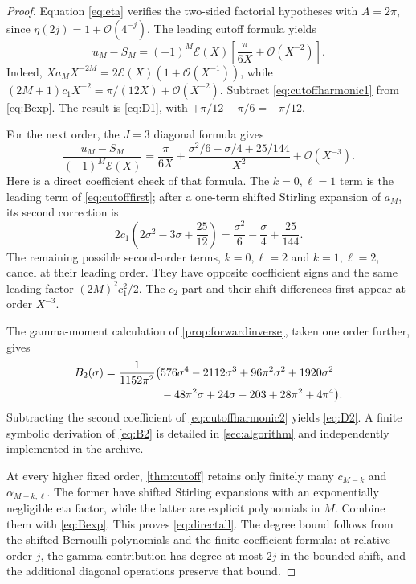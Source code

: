 \documentclass[11pt,a4paper]{article}
\theoremstyle{definition}
\numberwithin{equation}{section}
\newcommand{\Oh}{\mathcal O}
\newcommand{\scal}{\mathcal E}
\begin{document}
\begin{proof}
Equation \eqref{eq:eta} verifies the two-sided factorial hypotheses with $A=2\pi$, since $\eta(2j)=1+\Oh(4^{-j})$. The leading cutoff formula yields
\begin{equation}
 u_M-S_M=(-1)^M\scal(X)
       \left[\frac\pi{6X}+\Oh(X^{-2})\right].
 \label{eq:cutoffharmonic1}
\end{equation}
Indeed, $X a_MX^{-2M}=2\scal(X)(1+\Oh(X^{-1}))$, while
$(2M+1)c_1X^{-2}=\pi/(12X)+\Oh(X^{-2})$.
Subtract \eqref{eq:cutoffharmonic1} from \eqref{eq:Bexp}. The result is \eqref{eq:D1}, with $+\pi/12-\pi/6=-\pi/12$.

For the next order, the $J=3$ diagonal formula gives
\begin{equation}
 \frac{u_M-S_M}{(-1)^M\scal(X)}
 =\frac\pi{6X}
  +\frac{\sigma^2/6-\sigma/4+25/144}{X^2}
  +\Oh(X^{-3}).
 \label{eq:cutoffharmonic2}
\end{equation}
Here is a direct coefficient check of that formula. The $k=0,\ell=1$ term is the leading term of \eqref{eq:cutofffirst}; after a one-term shifted Stirling expansion of $a_M$, its second correction is
\[
 2c_1\left(2\sigma^2-3\sigma+\frac{25}{12}\right)
 =\frac{\sigma^2}{6}-\frac\sigma4+\frac{25}{144}.
\]
The remaining possible second-order terms, $k=0,\ell=2$ and $k=1,\ell=2$, cancel at their leading order. They have opposite coefficient signs and the same leading factor $(2M)^2c_1^2/2$. The $c_2$ part and their shift differences first appear at order $X^{-3}$.

The gamma-moment calculation of \cref{prop:forwardinverse}, taken one order further, gives
\begin{align}
 B_2(\sigma)=\frac1{1152\pi^2}\bigl(&576\sigma^4-2112\sigma^3
 +96\pi^2\sigma^2+1920\sigma^2
 \notag\\
 &-48\pi^2\sigma+24\sigma-203+28\pi^2+4\pi^4\bigr).
 \label{eq:B2}
\end{align}
Subtracting the second coefficient of \eqref{eq:cutoffharmonic2} yields \eqref{eq:D2}. A finite symbolic derivation of \eqref{eq:B2} is detailed in \cref{sec:algorithm} and independently implemented in the archive.

At every higher fixed order, \cref{thm:cutoff} retains only finitely many $c_{M-k}$ and $\alpha_{M-k,\ell}$. The former have shifted Stirling expansions with an exponentially negligible eta factor, while the latter are explicit polynomials in $M$. Combine them with \eqref{eq:Bexp}. This proves \eqref{eq:directall}. The degree bound follows from the shifted Bernoulli polynomials and the finite coefficient formula: at relative order $j$, the gamma contribution has degree at most $2j$ in the bounded shift, and the additional diagonal operations preserve that bound.
\end{proof}
\end{document}
